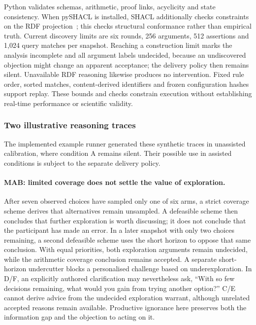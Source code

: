 \documentclass[11pt,a4paper]{article}
\begin{document}
Python validates schemas, arithmetic, proof links, acyclicity and state consistency. When pySHACL is installed, SHACL additionally checks constraints on the RDF projection~\cite{shacl}; this checks structural conformance rather than empirical truth. Current discovery limits are six rounds, 256 arguments, 512 assertions and 1,024 query matches per snapshot. Reaching a construction limit marks the analysis incomplete and all argument labels undecided, because an undiscovered objection might change an apparent acceptance; the delivery policy then remains silent. Unavailable RDF reasoning likewise produces no intervention. Fixed rule order, sorted matches, content-derived identifiers and frozen configuration hashes support replay. These bounds and checks constrain execution without establishing real-time performance or scientific validity.

\subsubsection{Two illustrative reasoning traces}
The implemented example runner generated these synthetic traces in unassisted calibration, where condition A remains silent. Their possible use in assisted conditions is subject to the separate delivery policy.

\paragraph{MAB: limited coverage does not settle the value of exploration.} After seven observed choices have sampled only one of six arms, a strict coverage scheme derives that alternatives remain unsampled. A defeasible scheme then concludes that further exploration is worth discussing; it does not conclude that the participant has made an error. In a later snapshot with only two choices remaining, a second defeasible scheme uses the short horizon to oppose that same conclusion. With equal priorities, both exploration arguments remain undecided, while the arithmetic coverage conclusion remains accepted. A separate short-horizon undercutter blocks a personalised challenge based on underexploration. In D/F, an explicitly authored clarification may nevertheless ask, ``With so few decisions remaining, what would you gain from trying another option?'' C/E cannot derive advice from the undecided exploration warrant, although unrelated accepted reasons remain available. Productive ignorance here preserves both the information gap and the objection to acting on it.
\end{document}
